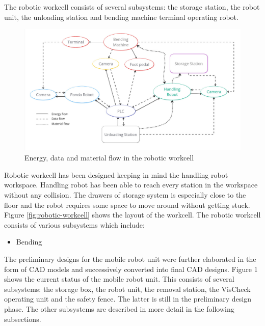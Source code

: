 The robotic workcell consists of several subsystems: the storage station, the robot unit, the unloading station and bending machine terminal operating robot.
\begin{figure}[h]
    \centering
    \includegraphics[width=\textwidth]{figures/workcell-flow.jpg}
    \caption{Energy, data and material flow in the robotic workcell}
    \label{fig:flow-workcell}
\end{figure}

Robotic workcell has been designed keeping in mind the handling robot workspace. Handling robot has been able to reach every station in the workspace without any collision. The drawers of storage system is especially close to the floor and the robot requires
some space to move around without getting stuck. Figure \ref{fig:robotic-workcell} shows the layout of the workcell. The robotic workcell consists of various subsystems which include:
\begin{itemize}
    \item Bending
\end{itemize}

The preliminary designs for the mobile robot unit were further elaborated
in the form of CAD models and successively converted into final CAD designs. Figure 1 shows the
current status of the mobile robot unit. This consists of several subsystems: the storage box, the robot
unit, the removal station, the VisCheck operating unit and the safety fence. The latter is still in the
preliminary design phase. The other subsystems are described in more detail in the following
subsections.

